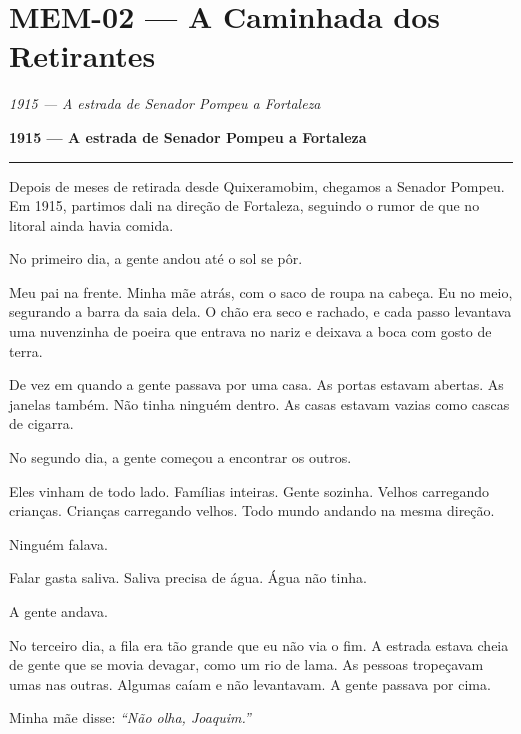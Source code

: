 \section*{\textbf{MEM-02} --- A Caminhada dos Retirantes}

\noindent \textit{1915 --- A estrada de Senador Pompeu a Fortaleza}

\noindent \textbf{1915 --- A estrada de Senador Pompeu a Fortaleza}

\vspace{0.5em}\noindent\rule{\textwidth}{0.5pt}\vspace{0.5em}

\noindent Depois de meses de retirada desde Quixeramobim, chegamos a Senador Pompeu. Em 1915, partimos dali na direção de Fortaleza, seguindo o rumor de que no litoral ainda havia comida.

\noindent No primeiro dia, a gente andou até o sol se pôr.

\noindent Meu pai na frente. Minha mãe atrás, com o saco de roupa na cabeça. Eu no meio, segurando a barra da saia dela. O chão era seco e rachado, e cada passo levantava uma nuvenzinha de poeira que entrava no nariz e deixava a boca com gosto de terra.

\noindent De vez em quando a gente passava por uma casa. As portas estavam abertas. As janelas também. Não tinha ninguém dentro. As casas estavam vazias como cascas de cigarra.

\noindent No segundo dia, a gente começou a encontrar os outros.

\noindent Eles vinham de todo lado. Famílias inteiras. Gente sozinha. Velhos carregando crianças. Crianças carregando velhos. Todo mundo andando na mesma direção.

\noindent Ninguém falava.

\noindent Falar gasta saliva. Saliva precisa de água. Água não tinha.

\noindent A gente andava.

\noindent No terceiro dia, a fila era tão grande que eu não via o fim. A estrada estava cheia de gente que se movia devagar, como um rio de lama. As pessoas tropeçavam umas nas outras. Algumas caíam e não levantavam. A gente passava por cima.

\noindent Minha mãe disse: \textit{\textquotedblleft{}Não olha, Joaquim.\textquotedblright{}}

